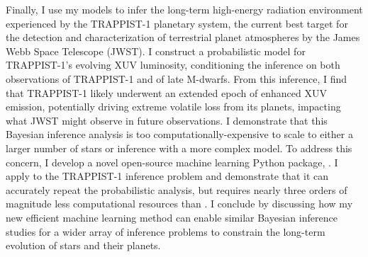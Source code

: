{Finally, I use my models to infer the long-term high-energy radiation environment experienced by the TRAPPIST-1 planetary system, the current best target for the detection and characterization of terrestrial planet atmospheres by the James Webb Space Telescope (JWST). I construct a probabilistic model for TRAPPIST-1's evolving XUV luminosity, conditioning the inference on both observations of TRAPPIST-1 and of late M-dwarfs. From this inference, I find that TRAPPIST-1 likely underwent an extended epoch of enhanced XUV emission, potentially driving extreme volatile loss from its planets, impacting what JWST might observe in future observations. I demonstrate that this Bayesian inference analysis is too computationally-expensive to scale to either a larger number of stars or inference with a more complex model. To address this concern, I develop a novel open-source machine learning Python package, \approxposterior. I apply \approxposterior to the TRAPPIST-1 inference problem and demonstrate that it can accurately repeat the probabilistic analysis, but requires nearly three orders of magnitude less computational resources than \emcee. I conclude by discussing how my new efficient machine learning method can enable similar Bayesian inference studies for a wider array of inference problems to constrain the long-term evolution of stars and their planets.}
